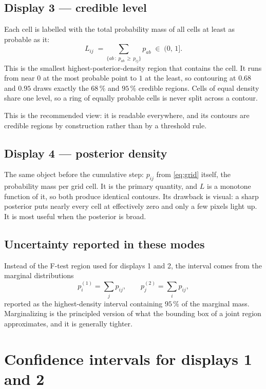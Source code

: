 \documentclass[11pt,a4paper]{article}
\begin{document}
\subsection{Display 3 --- credible level}

Each cell is labelled with the total probability mass of all cells at least
as probable as it:
\begin{equation}
L_{ij} \;=\!\!\sum_{\{ab\,:\; p_{ab}\,\ge\, p_{ij}\}}\!\! p_{ab}
\;\in\;(0,\,1].
\label{eq:level}
\end{equation}
This is the smallest highest-posterior-density region that contains the
cell. It runs from near $0$ at the most probable point to $1$ at the least,
so contouring at $0.68$ and $0.95$ draws exactly the $68\,\%$ and $95\,\%$
credible regions. Cells of equal density share one level, so a ring of
equally probable cells is never split across a contour.

This is the recommended view: it is readable everywhere, and its contours
are credible regions by construction rather than by a threshold rule.

\subsection{Display 4 --- posterior density}

The same object before the cumulative step: $p_{ij}$ from \eqref{eq:grid}
itself, the probability mass per grid cell. It is the primary quantity, and
$L$ is a monotone function of it, so both produce identical contours. Its
drawback is visual: a sharp posterior puts nearly every cell at effectively
zero and only a few pixels light up. It is most useful when the posterior
is broad.

\subsection{Uncertainty reported in these modes}

Instead of the F-test region used for displays 1 and 2, the interval comes
from the marginal distributions
\begin{equation}
p^{(1)}_i = \sum_j p_{ij},
\qquad
p^{(2)}_j = \sum_i p_{ij},
\end{equation}
reported as the highest-density interval containing $95\,\%$ of the marginal
mass. Marginalizing is the principled version of what the bounding box of a
joint region approximates, and it is generally tighter.

\section{Confidence intervals for displays 1 and 2}
\label{sec:ftest}
\end{document}
